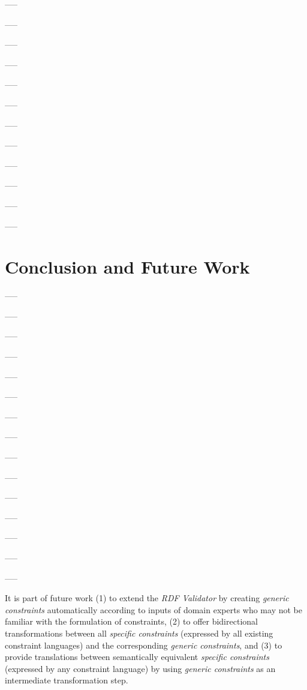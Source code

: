 \documentclass[a4paper,fontsize=11pt]{scrartcl}
\begin{document}
-----

-----

-----

-----

-----

-----

-----

-----

-----

-----

-----

-----

\section{Conclusion and Future Work}

-----

-----

-----

-----

-----

-----

-----

-----

-----

-----

-----

-----

-----

-----

-----

It is part of future work 
(1) to extend the \emph{RDF Validator} by creating \emph{generic constraints} automatically according to inputs of domain experts who may not be familiar with the formulation of constraints,
(2) to offer bidirectional transformations between all \emph{specific constraints} (expressed by all existing constraint languages) and the corresponding \emph{generic constraints}, and
(3) to provide translations between semantically equivalent \emph{specific constraints} (expressed by any constraint language) by using \emph{generic constraints} as an intermediate transformation step.
\end{document}
